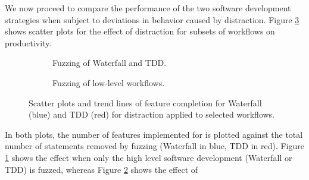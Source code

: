 \documentclass{llncs}
\begin{document}
We now proceed to compare the performance of the two software development strategies when subject to deviations in
behavior caused by distraction. Figure \ref{fig:fuzzing-features} shows scatter plots for the effect of distraction for
subsets of workflows on productivity.%
\begin{figure}[t]
  \centering
  \hfill
  \begin{subfigure}[t]{2.3in}%
    \caption{Fuzzing of Waterfall and TDD.}
    \label{fig:fuzzing-features:WF}
  \end{subfigure}
  \hfill
  \begin{subfigure}[t]{2.3in}
    \caption{Fuzzing of low-level workflows.}  
  \label{fig:fuzzing-features:CTIDR}
  \end{subfigure}
  \hfill

  \caption{Scatter plots and trend lines of feature completion for Waterfall (blue) and TDD (red) for distraction
    applied to selected workflows.}
  \label{fig:fuzzing-features}
\end{figure}
In both plots, the number of features implemented for is plotted against the total number of statements removed by
fuzzing (Waterfall in blue, TDD in red). Figure \ref{fig:fuzzing-features:WF} shows the effect when only the high level
software development (Waterfall or TDD) is fuzzed, whereas Figure \ref{fig:fuzzing-features:CTIDR} shows the effect of
\end{document}
